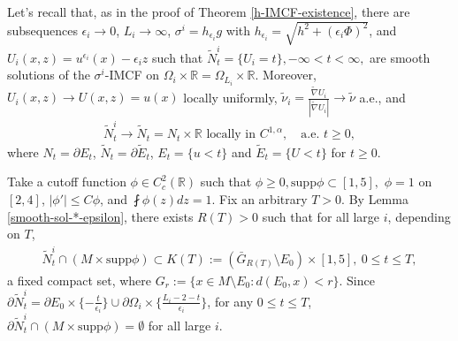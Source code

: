 \documentclass[11pt, letterpaper]{amsart}
\theoremstyle{definition}
\theoremstyle{remark}
\begin{document}
Let's recall that, as in the proof of Theorem \ref{h-IMCF-existence}, there are subsequences $\epsilon _i\to 0$, $L_i \to \infty$, $\sigma ^{i}= h_{\epsilon _i} g$ with $h_{\epsilon _i} = \sqrt{h^2+ (\epsilon _i \Phi )^2} $, and $U_i(x,z) = u ^{\epsilon _i}(x) - \epsilon _i z$ such that $\tilde{N}^{i}_t= \{ U_i = t\}, -\infty< t< \infty, $ are smooth solutions of the $\sigma ^{i}$-IMCF on $\Omega _i \times \mathbb{R} = \Omega _{L_i} \times \mathbb{R}$. Moreover, $U_i(x,z) \to U(x,z) = u(x)$ locally uniformly, $\tilde{\nu }_i = \frac{\tilde{\nabla } U_i}{|\tilde{\nabla } U_i|} \to \tilde{\nu }$ a.e., and
\begin{align}\label{N_t-C1alpha-conv}
	\tilde{N}^{i}_{t} \to \tilde{N}_{t}= N_{t} \times \mathbb{R} \text{ locally in } C^{1,\alpha },\quad \text{a.e. } t \geq 0,
\end{align}
where $N_t = \partial E_t$, $\tilde{N}_t = \partial \tilde{E}_t$, $E_t = \{u< t\} $ and $\tilde{E}_t = \{ U< t\} $ for $t \geq 0$. 

Take a cutoff function $\phi \in C^{2}_{c}(\mathbb{R})$ such that $\phi \geq 0, \mathrm{supp} \phi \subset [1,5],$ $\phi =1$ on $[2,4]$, $|\phi '| \leq C \phi $, and $\fint \phi (z) dz =1$. Fix an arbitrary $T>0$. By Lemma \ref{smooth-sol-*-epsilon}, there exists $R(T)>0$ such that for all large $i$, depending on $T$,
\begin{align*}
	\tilde{N}^{i}_t \cap (M \times \mathrm{supp} \phi ) \subset K(T):= (\bar{G}_{R(T)} \setminus E_0 ) \times [1,5],\ 0 \leq t \leq T,
\end{align*}
a fixed compact set, where $G_{r}:= \{x \in M \setminus E_0: d(E_0, x) < r \} $. Since $\partial \tilde{N}^{i}_t = \partial E_0 \times \{ - \frac{t}{\epsilon _i}\} \cup \partial \Omega _i \times \{\frac{L_i - 2 - t}{\epsilon _i}\} $, for any $0 \leq t \leq T$, $\partial \tilde{N}^{i}_t \cap (M \times \mathrm{supp} \phi ) = \emptyset$ for all large $i$.
\end{document}
